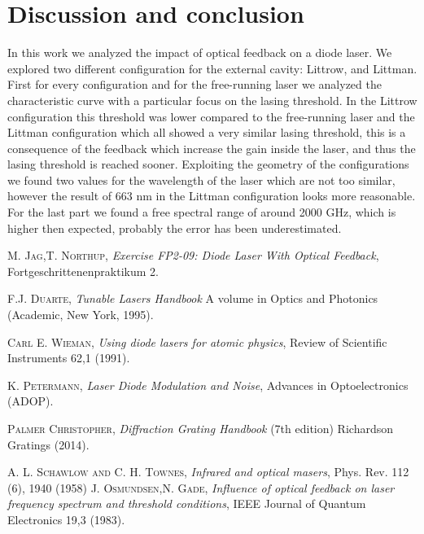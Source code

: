 \documentclass[a4paper,10pt]{article}
\begin{document}
\section{Discussion and conclusion}
In this work we analyzed the impact of optical feedback on a diode laser. We explored two different configuration for the external cavity: Littrow, and Littman. First for every configuration and for the free-running laser we analyzed the characteristic curve with a particular focus on the lasing threshold. In the Littrow configuration this threshold was lower compared to the free-running laser and the Littman configuration which all showed a very similar lasing threshold, this is a consequence of the feedback which increase the gain inside the laser, and thus the lasing threshold is reached sooner. Exploiting the geometry of the configurations we found two values for the wavelength of the laser which are not too similar, however the result of 663 nm in the Littman configuration looks more reasonable. For the last part we found a free spectral range of around 2000 GHz, which is higher then expected, probably the error has been underestimated.
\begin{thebibliography}{99}
\textsc{M. Jag,T. Northup}, \textit{Exercise FP2-09: Diode Laser With Optical Feedback}, Fortgeschrittenenpraktikum 2.

\textsc{F.J. Duarte}, \textit{Tunable Lasers Handbook} A volume in Optics and Photonics (Academic, New York, 1995). 

 \textsc{Carl E. Wieman}, \textit{Using diode lasers for atomic physics}, Review of Scientific Instruments 62,1 (1991).
 
    \textsc{K. Petermann}, \textit{Laser Diode Modulation and Noise}, Advances in Optoelectronics (ADOP).

\textsc{Palmer Christopher}, \textit{Diffraction Grating Handbook} (7th edition) Richardson Gratings (2014). 

\textsc{A. L. Schawlow and C. H. Townes}, \textit{Infrared and optical masers}, Phys. Rev. 112 (6), 1940 (1958)
\textsc{J. Osmundsen,N. Gade}, \textit{Influence of optical feedback on laser frequency spectrum and threshold conditions}, IEEE Journal of Quantum Electronics 19,3 (1983).

\end{thebibliography}
\end{document}
